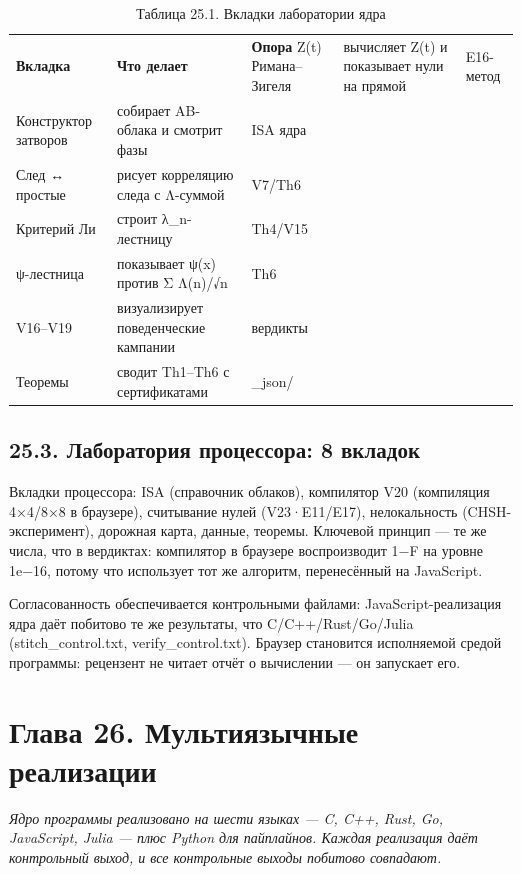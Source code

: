 \documentclass[11pt,a4paper]{article}
\begin{document}
\begin{table}[htbp]\centering\small
\caption{Таблица 25.1. Вкладки лаборатории ядра}
\begin{tabular}{p{} p{} p{}}
\toprule
\textbf{Вкладка} & \textbf{Что делает} & \textbf{Опора}
\midrule
Z(t) Римана–Зигеля & вычисляет Z(t) и показывает нули на прямой & E16-метод \\
Конструктор затворов & собирает AB-облака и смотрит фазы & ISA ядра \\
След ↔ простые & рисует корреляцию следа с Λ-суммой & V7/Th6 \\
Критерий Ли & строит λ\_n-лестницу & Th4/V15 \\
ψ-лестница & показывает ψ(x) против Σ Λ(n)/√n & Th6 \\
V16–V19 & визуализирует поведенческие кампании & вердикты \\
Теоремы & сводит Th1–Th6 с сертификатами & \_json/ \\
\bottomrule
\end{tabular}
\end{table}

\subsection{25.3. Лаборатория процессора: 8 вкладок}

Вкладки процессора: ISA (справочник облаков), компилятор V20 (компиляция 4×4/8×8 в браузере), считывание нулей (V23·E11/E17), нелокальность (CHSH-эксперимент), дорожная карта, данные, теоремы. Ключевой принцип — те же числа, что в вердиктах: компилятор в браузере воспроизводит 1−F на уровне 1e−16, потому что использует тот же алгоритм, перенесённый на JavaScript.

Согласованность обеспечивается контрольными файлами: JavaScript-реализация ядра даёт побитово те же результаты, что C/C++/Rust/Go/Julia (stitch\_control.txt, verify\_control.txt). Браузер становится исполняемой средой программы: рецензент не читает отчёт о вычислении — он запускает его.

\section{Глава 26. Мультиязычные реализации}

\noindent\textit{\color{copper}Ядро программы реализовано на шести языках — C, C++, Rust, Go, JavaScript, Julia — плюс Python для пайплайнов. Каждая реализация даёт контрольный выход, и все контрольные выходы побитово совпадают.}
\end{document}
